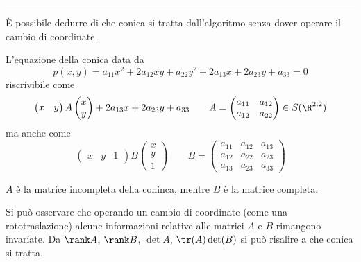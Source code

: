 \rule{7em}{.4pt}

È possibile dedurre di che conica si tratta dall'algoritmo senza dover operare il cambio di coordinate.

L'equazione della conica data da \[
    p(x,y)=a_{11} x^{2} + 2 a_{12} xy + a_{22}y^{2} + 2 a_{13}x + 2 a_{23} y + a_{33}=0
\] 
riscrivibile come 
\[
    \begin{pmatrix}
        x & y
    \end{pmatrix} A \begin{pmatrix}
        x\\ y
    \end{pmatrix} + 2a_{13} x + 2a_{23}y+a_{33}\qquad A=\begin{pmatrix}
        a_{11} & a_{12}\\
        a_{12} & a_{22}
    \end{pmatrix} \in S(\R^{2,2})
\] 
ma anche come
\[
    \begin{pmatrix}
        x & y & 1
    \end{pmatrix} B \begin{pmatrix}
        x\\ y\\ 1
    \end{pmatrix}\qquad B=\begin{pmatrix}
        a_{11} & a_{12} & a_{13}\\
        a_{12} & a_{22} & a_{23}\\
        a_{13} & a_{23} & a_{33}
    \end{pmatrix}
\]

$ A $ è la matrice incompleta della coninca, mentre $ B $ è la matrice completa.

Si può osservare che operando un cambio di coordinate (come una rototraslazione) alcune informazioni relative alle matrici $ A $ e $ B $ rimangono invariate. Da $ \rank A $, $ \rank B $, $ \det A $, $ \tr(A)\det(B) $ si può risalire a che conica si tratta.


